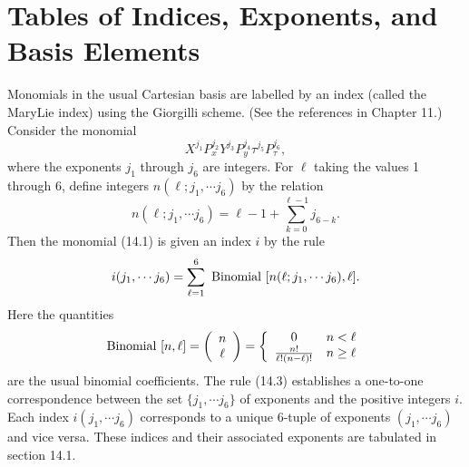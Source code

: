 
\chapter{Tables of Indices, Exponents, and Basis Elements}    
Monomials in the usual Cartesian basis are labelled by an index (called the
MaryLie index) using the Giorgilli scheme.  (See the references in
Chapter 11.)  Consider the monomial
\renewcommand{\theequation}{\thechapter.\arabic{equation}}
\begin{equation}
X^{j_1}P^{j_2}_xY^{j_3}P^{j_4}_y\tau^{j_5} P^{j_6}_{\tau},
\end{equation}
where the exponents $j_1$ through $j_6$ are integers.  For $\ell$ taking
the values 1 through 6, define integers $n(\ell ; j_1, \cdots j_6)$
by the relation
\begin{equation}
n(\ell ; j_1, \cdots j_6) = \ell - 1 + \sum^{\ell - 1}_{k=0} j_{6-k}.
\end{equation}
Then the monomial (14.1) is given an index $i$ by the rule
\begin{equation}
i(j_1, \cdots j_6) = \sum^6_{\ell = 1} \ {\rm Binomial} \ [n(\ell ; j_1,
\cdots j_6), \ell].
\end{equation}
Here the quantities
\begin{equation}
{\rm Binomial} \ [n, \ell ] = \left( \begin{array}{c} n \\
\ell \end{array} \right) = \left\{ \begin{array}{cc} 0 & n < \ell \\
\frac{n!}{\ell !(n-\ell ) !} & n \geq \ell \end{array} \right.
\end{equation}
are the usual binomial coefficients.  The rule (14.3) establishes a one-to-one
correspondence between the set $\{j_1, \cdots j_6\}$ of exponents and
the positive integers $i$.  Each index $i(j_1, \cdots j_6)$ corresponds to
a unique 6-tuple of exponents $(j_1, \cdots j_6)$ and vice versa.  These indices and their associated exponents are tabulated in section 14.1.

